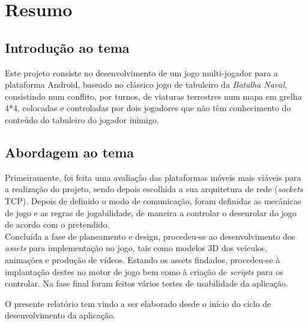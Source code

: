 \chapter{Resumo}
\label{chap:resumo}

\section{Introdução ao tema}
\label{resumo:sec:intro}
Este projeto consiste no desenvolvimento de um jogo multi-jogador para a plataforma Android, baseado no clássico jogo de tabuleiro da \emph{Batalha Naval}, consistindo num conflito, por turnos, de viaturas terrestres num mapa em grelha 4*4, colocadas e controladas por dois jogadores que não têm conhecimento do conteúdo do tabuleiro do jogador inimigo.


\section{Abordagem ao tema}
\label{resumo:sec:ATL}
Primeiramente, foi feita uma avaliação das plataformas móveis mais viáveis para a realização do projeto, sendo depois escolhida a sua arquitetura de rede (\textit{sockets} \ac{TCP}). Depois de definido o modo de comunicação, foram definidas as mecânicas de jogo e as regras de jogabilidade, de maneira a controlar o desenrolar do jogo de acordo com o pretendido. \\ 

Concluída a fase de planeamento e design, procedeu-se ao desenvolvimento dos \textit{assets} para implementação no jogo, tais como modelos 3D dos veículos, animações e produção de vídeos. Estando os assets findados, procedeu-se à implantação destes no motor de jogo bem como à criação de \textit{scripts} para os controlar. Na fase final foram feitos vários testes de usabilidade da aplicação.

O presente relatório tem vindo a ser elaborado desde o início do ciclo de desenvolvimento da aplicação.


